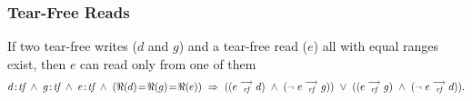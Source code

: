       \subsubsection{Tear-Free Reads} 
               If two tear-free writes ($d$ and $g$) and a tear-free read ($e$) all with equal ranges exist, then $e$ can read only from one of them
                \begin{align*}
                      \et{d}{tf}\ \wedge\ \et{g}{tf} \ \wedge \ \et{e}{tf} 
                        \ \wedge \ 
                        (\Re(d) \!=\! \Re(g) \!=\! \Re(e)) 
                        \ \Rightarrow{} \ 
                            ((\reln{e}{rf}{d}) 
                            \ \wedge \ 
                            (\neg \ \reln{e}{rf}{g})) 
                        \ \vee \  
                            ((\reln{e}{rf}{g}) 
                            \ \wedge \
                            (\neg \ \reln{e}{rf}{d})).
                \end{align*}
                    
